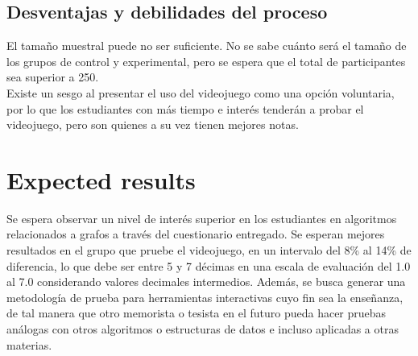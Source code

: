 \documentclass[submission]{eptcs}
\begin{document}
\subsection{Desventajas y debilidades del proceso}

El tamaño muestral puede no ser suficiente. No se sabe cuánto será el tamaño de los grupos de control
y experimental, pero se espera que el total de participantes sea superior a 250. \\
Existe un sesgo al presentar el uso del videojuego como una opción voluntaria, por lo que los estudiantes
con más tiempo e interés tenderán a probar el videojuego, pero son quienes a su vez tienen mejores notas. \\


\section{Expected results}

Se espera observar un nivel de interés superior en los estudiantes en algoritmos
relacionados a grafos a través del cuestionario entregado.
Se esperan mejores resultados en el grupo que pruebe el videojuego, en un intervalo del
8\% al 14\% de diferencia, lo que debe ser entre 5 y 7 décimas en una escala de evaluación del 1.0 al 7.0
considerando valores decimales intermedios.
Además, se busca generar una metodología de prueba para herramientas interactivas cuyo fin sea la enseñanza,
de tal manera que otro memorista o tesista en el futuro pueda hacer pruebas análogas con otros algoritmos
o estructuras de datos e incluso aplicadas a otras materias.


\nocite{*}


\end{document}
